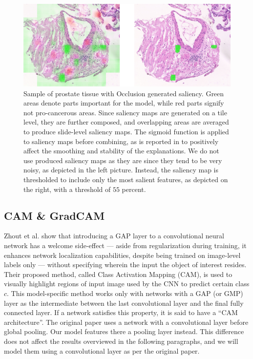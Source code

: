 \begin{figure}[!h]
    \begin{center}
    \begin{minipage}{1\textwidth}
      \includegraphics[width=\textwidth]{img/occlusion.png}
    \end{minipage}
    \caption{Sample of prostate tissue with Occlusion generated saliency. Green areas denote parts important for the model, while red parts signify not pro-cancerous areas. Since saliency maps are generated on a tile level, they are further composed, and overlapping areas are averaged to produce slide-level saliency maps. The sigmoid function is applied to saliency maps before combining, as is reported in \cite{gallo} to positively affect the smoothing and stability of the explanations. We do not use produced saliency maps as they are since they tend to be very noisy, as depicted in the left picture. Instead, the saliency map is thresholded to include only the most salient features, as depicted on the right, with a threshold of $55$ percent.}
    \label{fig:occ-saliency}
    \end{center}
\end{figure}

\subsection{CAM \& GradCAM}\label{subsec:cam}

Zhout et al. \cite{cam} show that introducing a GAP layer to a convolutional neural network has a welcome side-effect --- aside from regularization during training, it enhances network localization capabilities, despite being trained on image-level labels only --- without specifying wherein the input the object of interest resides.
Their proposed method, called Class Activation Mapping (CAM), is used to visually highlight regions of input image used by the CNN to predict certain class $c$.
This model-specific method works only with networks with a GAP (or GMP) layer as the intermediate between the last convolutional layer and the final fully connected layer.
If a network satisfies this property, it is said to have a ``CAM architecture''.
The original paper uses a network with a convolutional layer before global pooling.
Our model features there a pooling layer instead.
This difference does not affect the results overviewed in the following paragraphs, and we will model them using a convolutional layer as per the original paper. 

